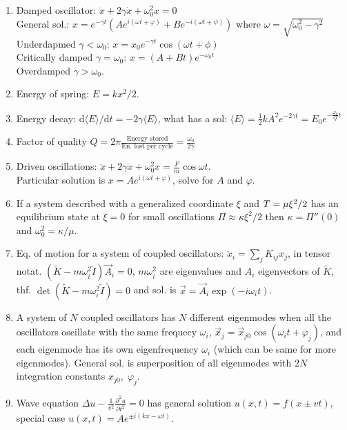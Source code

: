 \documentclass{article}
\renewcommand\d{\mathrm d}
\begin{document}
\begin{multicols}{3}

    \begin{enumerate}
        \item Damped oscillator: $\ddot x+2\gamma\dot x+\omega_0^2 x=0$\\
            General sol.: $x=e^{-\gamma t}(Ae^{i(\omega t+\varphi)}+Be^{-i(\omega t+\psi)})$ where $\omega=\sqrt{\omega^2_0-\gamma^2}$\\
            Underdapmed $\gamma<\omega_0$: $x=x_0e^{-\gamma t}\cos(\omega t+\phi)$\\
            Critically damped $\gamma=\omega_0$: $x=(A+Bt)e^{-\omega_0 t}$\\
            Overdamped $\gamma>\omega_0$.
        \item Energy of spring: $E=kx^2/2$.
        \item Energy decay: $\d\langle E\rangle/\d t=-2\gamma\langle E\rangle$, what has a sol: $\langle E\rangle=\frac{1}{2}kA^2e^{-2\gamma t}=E_0e^{-\frac{\omega_0}{Q}t}$
        \item Factor of quality $Q=2\pi\frac{\text{Energy stored}}{\text{En. lost per cycle}}=\frac{\omega_0}{2\gamma}$
        \item Driven oscillations: $\ddot x+2\gamma\dot x+\omega_0^2 x=\frac{F}{m}\cos{\omega t}$.\\Particular solution is $x=Ae^{i(\omega t+\varphi)}$, solve for $A$ and $\varphi$.
        \item If a system described with a generalized coordinate $\xi$ and $T=\mu\do\xi^2/2$ has an equilibrium state at $\xi=0$ for small oscillations $\Pi\approx\kappa\xi^2/2$ then $\kappa=\Pi''(0)$ and $\omega^2_0=\kappa/\mu$.
        \item Eq. of motion for a system of coupled oscillators: $\ddot x_i=\sum_j K_{ij}x_j$, in tensor notat. $\left(\tilde K-m\omega_i^2\tilde I\right)\vec A_i=0$, $m\omega^2_i$ are eigenvalues and $A_i$ eigenvectors of $\tilde K$, thf. $\det\left(\tilde K-m\omega_i^2\tilde I\right)=0$ and sol. is $\vec x=\vec A_i\exp(-i\omega_i t)$.
        \item A system of $N$ coupled oscillators has $N$ different eigenmodes when all the oscillators oscillate with the same frequecy $\omega_i$, $\vec x_j=\vec x_{j0}\cos(\omega_i t+\varphi_j)$, and each eigenmode has its own eigenfrequency $\omega_i$ (which can be same for more eigenmodes). General sol. is superposition of all eigenmodes with $2N$ integration constants $x_{j0},\;\varphi_j$.
        \item Wave equation $\Delta u-\frac{1}{v^2}\frac{\partial^2u}{\partial t^2}=0$ has general solution $u(x,t)=f(x\pm vt)$, special case $u(x,t)=Ae^{\pm i(kx-\omega t)}$.

\end{enumerate}
\end{multicols}
\end{document}
